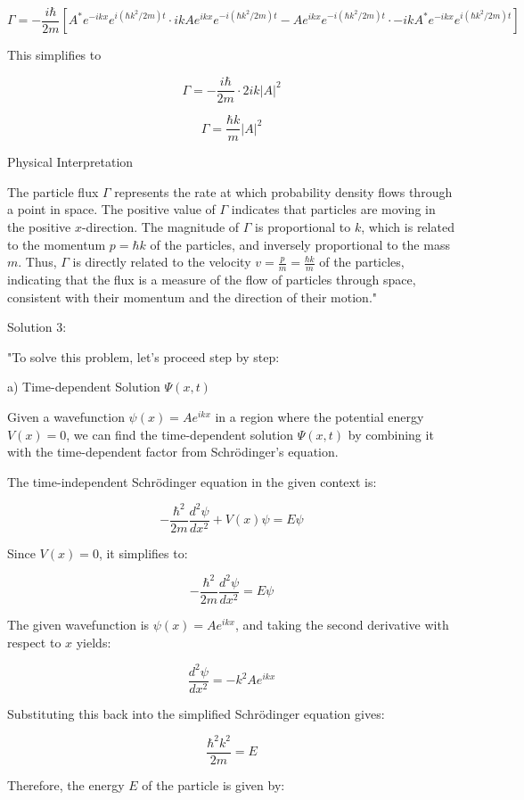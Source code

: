 \[
\Gamma = -\frac{i\hbar}{2m}\left[ A^*e^{-ikx}e^{i(\hbar k^2/2m)t} \cdot ikAe^{ikx}e^{-i(\hbar k^2/2m)t} - Ae^{ikx}e^{-i(\hbar k^2/2m)t} \cdot -ikA^*e^{-ikx}e^{i(\hbar k^2/2m)t} \right]
\]

This simplifies to

\[
\Gamma = -\frac{i\hbar}{2m} \cdot 2ik|A|^2
\]

\[
\Gamma = \frac{\hbar k}{m}|A|^2
\]

Physical Interpretation

The particle flux \( \Gamma \) represents the rate at which probability density flows through a point in space. The positive value of \( \Gamma \) indicates that particles are moving in the positive \( x \)-direction. The magnitude of \( \Gamma \) is proportional to \( k \), which is related to the momentum \( p = \hbar k \) of the particles, and inversely proportional to the mass \( m \). Thus, \( \Gamma \) is directly related to the velocity \( v = \frac{p}{m} = \frac{\hbar k}{m} \) of the particles, indicating that the flux is a measure of the flow of particles through space, consistent with their momentum and the direction of their motion."

Solution 3:

"To solve this problem, let's proceed step by step:

a) Time-dependent Solution \( \Psi(x,t) \)

Given a wavefunction \( \psi(x) = Ae^{ikx} \) in a region where the potential energy \( V(x) = 0 \), we can find the time-dependent solution \( \Psi(x,t) \) by combining it with the time-dependent factor from Schrödinger's equation.

The time-independent Schrödinger equation in the given context is:

\[ -\frac{\hbar^2}{2m}\frac{d^2\psi}{dx^2} + V(x)\psi = E\psi \]

Since \( V(x) = 0 \), it simplifies to:

\[ -\frac{\hbar^2}{2m}\frac{d^2\psi}{dx^2} = E\psi \]

The given wavefunction is \( \psi(x) = Ae^{ikx} \), and taking the second derivative with respect to \( x \) yields:

\[ \frac{d^2\psi}{dx^2} = -k^2Ae^{ikx} \]

Substituting this back into the simplified Schrödinger equation gives:

\[ \frac{\hbar^2k^2}{2m} = E \]

Therefore, the energy \( E \) of the particle is given by:


